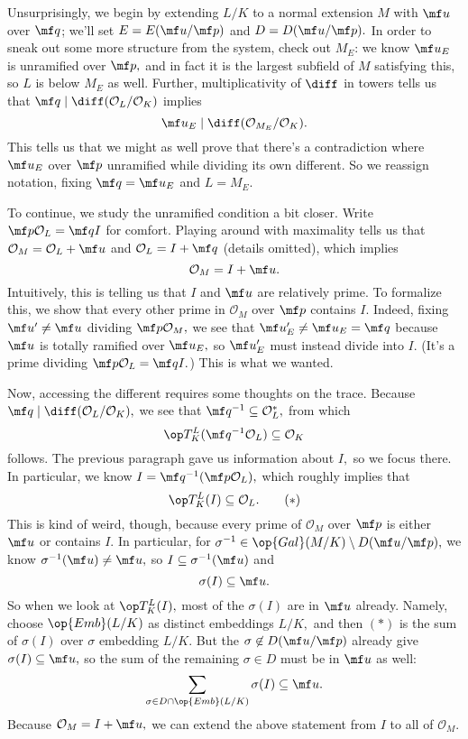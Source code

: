 Unsurprisingly, we begin by extending $L/K$ to a normal extension $M$ with $\mf u$ over $\mf q$; we'll set $E=E(\mf u/\mf p)$ and $D=D(\mf u/\mf p).$ In order to sneak out some more structure from the system, check out $M_E$: we know $\mf u_E$ is unramified over $\mf p,$ and in fact it is the largest subfield of $M$ satisfying this, so $L$ is below $M_E$ as well. Further, multiplicativity of $\diff$ in towers tells us that $\mf q\mid\diff(\mathcal O_L/\mathcal O_K)$ implies
\[\mf u_E\mid\diff(\mathcal O_{M_E}/\mathcal O_K).\]
This tells us that we might as well prove that there's a contradiction where $\mf u_E$ over $\mf p$ unramified while dividing its own different. So we reassign notation, fixing $\mf q=\mf u_E$ and $L=M_E.$

To continue, we study the unramified condition a bit closer. Write $\mf p\mathcal O_L=\mf qI$ for comfort. Playing around with maximality tells us that $\mathcal O_M=\mathcal O_L+\mf u$ and $\mathcal O_L=I+\mf q$ (details omitted), which implies
\[\mathcal O_M=I+\mf u.\]
Intuitively, this is telling us that $I$ and $\mf u$ are relatively prime. To formalize this, we show that every other prime in $\mathcal O_M$ over $\mf p$ contains $I.$ Indeed, fixing $\mf u'\ne\mf u$ dividing $\mf p\mathcal O_M,$ we see that $\mf u'_E\ne\mf u_E=\mf q$ because $\mf u$ is totally ramified over $\mf u_E,$ so $\mf u'_E$ must instead divide into $I.$ (It's a prime dividing $\mf p\mathcal O_L=\mf qI.$) This is what we wanted.

Now, accessing the different requires some thoughts on the trace. Because $\mf q\mid\diff(\mathcal O_L/\mathcal O_K),$ we see that $\mf q^{-1}\subseteq\mathcal O_L^*,$ from which
\[\op T_K^L(\mf q^{-1}\mathcal O_L)\subseteq\mathcal O_K\]
follows. The previous paragraph gave us information about $I,$ so we focus there. In particular, we know $I=\mf q^{-1}(\mf p\mathcal O_L),$ which roughly implies that
\[\op T_K^L(I)\subseteq\mathcal O_L.\tag{$*$}\]
This is kind of weird, though, because every prime of $\mathcal O_M$ over $\mf p$ is either $\mf u$ or contains $I.$ In particular, for $\sigma^{-1}\in\op{Gal}(M/K)\setminus D(\mf u/\mf p),$ we know $\sigma^{-1}(\mf u)\ne\mf u,$ so $I\subseteq\sigma^{-1}(\mf u)$ and
\[\sigma(I)\subseteq\mf u.\]
So when we look at $\op T_K^L(I),$ most of the $\sigma(I)$ are in $\mf u$ already. Namely, choose $\op{Emb}(L/K)$ as distinct embeddings $L/K,$ and then $(*)$ is the sum of $\sigma(I)$ over $\sigma$ embedding $L/K.$ But the $\sigma\not\in D(\mf u/\mf p)$ already give $\sigma(I)\subseteq\mf u,$ so the sum of the remaining $\sigma\in D$ must be in $\mf u$ as well:
\[\sum_{\sigma\in D\cap\op{Emb}(L/K)}\sigma(I)\subseteq\mf u.\]
Because $\mathcal O_M=I+\mf u,$ we can extend the above statement from $I$ to all of $\mathcal O_M.$


